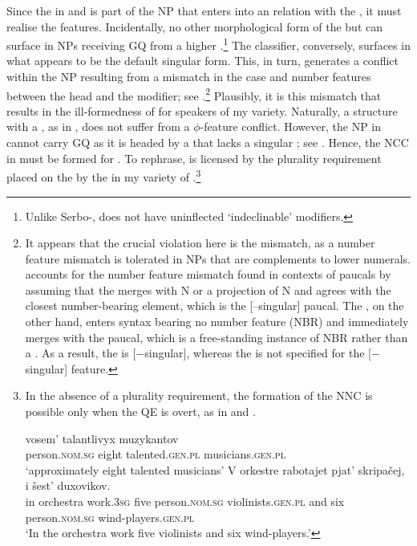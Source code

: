 \documentclass[output=paper,modfonts,newtxmath,hidelinks]{langscibook}
\begin{document}
\noindent Since the  in  and  is part of the NP that enters into an  relation with the , it must realise the   features. Incidentally, no other morphological form of the  but   can surface in NPs receiving GQ from a higher .\footnote{\label{18:fn15} Unlike Serbo-,  does not have uninflected ‘indeclinable’ modifiers.} The classifier, conversely, surfaces in what appears to be the default  singular form. This, in turn, generates a conflict within the NP resulting from a mismatch in the case and number features between the head and the modifier; see .\footnote{\label{18:fn16} It appears that the crucial violation here is the  mismatch, as a number feature mismatch is tolerated in  NPs that are complements to lower numerals. \citet{Pesetsky2013} accounts for the number feature mismatch found in contexts of paucals by assuming that the  merges with N or a projection of N and agrees with the closest number-bearing element, which is the [–singular] paucal. The , on the other hand, enters syntax bearing no number feature (NBR) and immediately merges with the paucal, which is a free-standing instance of NBR rather than a . As a result, the  is [$-$singular], whereas the  is not specified for the [$-$singular] feature.} Plausibly, it is this mismatch that results in the ill-formedness of  for speakers of my variety. Naturally, a structure with a  , as in , does not suffer from a ${\phi}${}-feature conflict. However, the NP in  cannot carry GQ as it is headed by a  that lacks a singular ; see . Hence, the NCC in  must be formed for . To rephrase,  is licensed by the plurality requirement placed on the  by the  in my variety of .\footnote{\label{18:fn17}In the absence of a plurality requirement, the formation of the NNC is possible only when the QE is overt, as in  and .   

\ea \label{18:fn17i}
\gll {}      vosem’  talantlivyx  muzykantov \\  
	 person.\textsc{nom.sg} eight  talented.\textsc{gen.pl}  musicians.\textsc{gen.pl} \\
\glt `approximately eight talented musicians'  
\z
\ea\label{18:fn17ii}
\gll V orkestre rabotajet pjat’  skripačej, i šest’  duxovikov. \\
	 in orchestra work.\textsc{3sg} five person.\textsc{nom.sg} violinists.\textsc{gen.pl} and six person.\textsc{nom.sg} wind-players.\textsc{gen.pl} \\
\glt `In the orchestra work five violinists and six wind-players.'
\zlast
}
\end{document}
